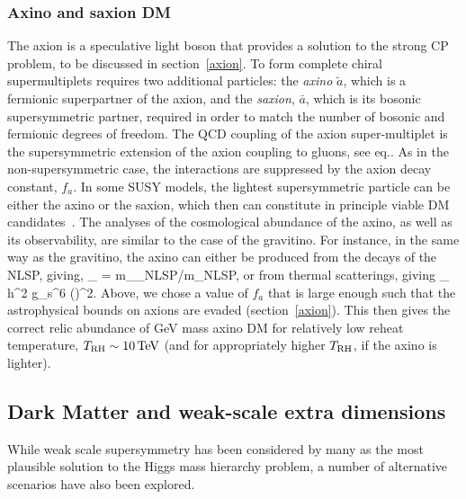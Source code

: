 \subsubsection{Axino and saxion DM}

The axion is a speculative light boson that provides a solution to the strong CP problem, to be discussed in section~\ref{axion}. 
To form complete chiral supermultiplets requires two additional particles: the {\em axino} $\tilde a$, which is a fermionic superpartner of the axion, and the {\em saxion}, 
$\bar a$, which is its bosonic supersymmetric partner, required in order to match the number of bosonic and fermionic degrees of freedom.
The QCD coupling of the axion super-multiplet
is the supersymmetric extension of the axion coupling to gluons, see eq.. As in the non-supersymmetric case, the interactions are  
suppressed by the axion decay constant, $f_a$.
In some SUSY models, the lightest supersymmetric particle can be either the axino or the saxion, which then can constitute in principle viable DM candidates~\cite{Axino:DM}. 
The analyses  of the cosmological abundance of the axino, as well as its observability, are similar to the case of the gravitino.
For instance, in the same way as the gravitino, the axino can either be produced 
from the decays of the NLSP, giving,
\beq
 \Omega_{} = m_{}\Omega_{\rm NLSP}/m_{\rm NLSP},
 \eeq
or from  thermal scatterings, giving
\beq \label{eq:Omegaaxino}
\Omega_{} h^2  g_{\rm s}^6   \ln {} 
\bigg(\bigg)^2.
\eeq
Above, we chose a value of $f_a$ that is large enough such that the astrophysical bounds on axions are evaded (section~\ref{axion}). 
This then gives the correct relic abundance of GeV mass axino DM for relatively low reheat temperature, $T_{\rm RH}\sim 10\,{\rm TeV}$ 
(and for appropriately higher $T_{\rm RH}$, if the axino is lighter).



\subsection{Dark Matter and weak-scale extra dimensions}\label{sec:Xdim}
While weak scale supersymmetry has been considered by many as
the most plausible solution to the Higgs mass hierarchy problem, a number of alternative scenarios have also been explored.

